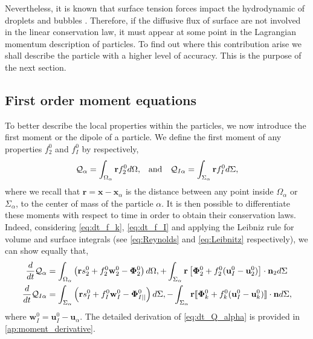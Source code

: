 Nevertheless, it is known that surface tension forces impact the hydrodynamic of droplets and bubbles \citep{kentheswaran2022direct,pesci2018computational}. 
Therefore, if the diffusive flux of surface are not involved in the linear conservation law, it must appear at some point in the Lagrangian momentum description of  particles. 
To find out where this contribution arise we shall describe the particle with a higher level of accuracy. 
This is the purpose of the next section. 

\subsection{First order moment equations}

To better describe the local properties within the particles, we now introduce the first moment or the dipole of a particle.
We define the first moment of any properties $f_2^0$ and $f_I^0$ by respectively,
\begin{align}
    &\mathcal{Q}_\alpha 
    = \int_{\Omega_\alpha}  \textbf{r} f_2^0  d\Omega,
    &\text{and}&
    &\mathcal{Q}_{I\alpha}
    = \int_{\Sigma_\alpha}  \textbf{r} f_I^0  d\Sigma,
    \label{eq:first_moment_definition}
\end{align}
where we recall that $\textbf{r} = \textbf{x} - \textbf{x}_\alpha$ is the distance between any point inside $\Omega_\alpha$ or $\Sigma_\alpha$, to the center of mass of the particle $\alpha$.
It is then possible to differentiate these moments with respect to time in order to obtain their conservation laws.
Indeed, considering \ref{eq:dt_f_k}, \ref{eq:dt_f_I} and applying the Leibniz rule for volume and surface integrals (see \ref{eq:Reynolds} and \ref{eq:Leibnitz} respectively), we can show equally that,
\begin{align}
    \frac{d}{d t} {\mathcal{Q}_\alpha}
    &= \int_{\Omega_\alpha}  \left(
        \textbf{r} s_2^0         
        + f_2^0  \textbf{w}_2^0 
        - \mathbf{\Phi}_2^0
    \right)  d\Omega,
    + \int_{\Sigma_\alpha}  \textbf{r} \left[
        \mathbf{\Phi}_2^0
        + f_2^0 (\textbf{u}_I^0-\textbf{u}_2^0)
    \right]\cdot \textbf{n}_2   d\Sigma 
    \label{eq:dt_Q_alpha}\\
    \frac{d}{d t} {\mathcal{Q}_{I\alpha}}
    &= \int_{\Sigma_\alpha}  \left(
        \textbf{r}s_I^0
        + f_I^0 \textbf{w}_I^0
        - \mathbf{\Phi}_{I||}^0
    \right)  d\Sigma,
    - \int_{\Sigma_\alpha} \textbf{r} 
    \llbracket \mathbf{\Phi}_k^0
        + f_k^0 (\textbf{u}_I^0 - \textbf{u}_k^0)
     \rrbracket \cdot \textbf{n}
     d\Sigma,
    \label{eq:dt_Q_I_alpha}
\end{align}
where $\textbf{w}_I^0 = \textbf{u}_I^0 - \textbf{u}_\alpha$.
The detailed derivation of \ref{eq:dt_Q_alpha} is provided in \ref{ap:moment_derivative}.
